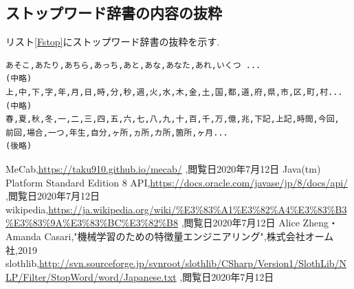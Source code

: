 \documentclass[a4j]{jarticle}
\begin{document}
\subsection{ストップワード辞書の内容の抜粋}
リスト\ref{Fstop}にストップワード辞書の抜粋を示す.
\begin{lstlisting}[basicstyle=\ttfamily\footnotesize, frame=single,label=Fstop,caption=ストップワード辞書の抜粋]
あそこ,あたり,あちら,あっち,あと,あな,あなた,あれ,いくつ ...
(中略)
上,中,下,字,年,月,日,時,分,秒,週,火,水,木,金,土,国,都,道,府,県,市,区,町,村...
(中略)
春,夏,秋,冬,一,二,三,四,五,六,七,八,九,十,百,千,万,億,兆,下記,上記,時間,今回,
前回,場合,一つ,年生,自分,ヶ所,ヵ所,カ所,箇所,ヶ月...
(後略)
	\end{lstlisting}


\begin{thebibliography}{9}
	 MeCab,\url{https://taku910.github.io/mecab/} ,閲覧日2020年7月12日
	 Java(tm) Platform Standard Edition 8 API,\url{https://docs.oracle.com/javase/jp/8/docs/api/} ,閲覧日2020年7月12日
	 wikipedia,\url{https://ja.wikipedia.org/wiki/%E3%83%A1%E3%82%A4%E3%83%B3%E3%83%9A%E3%83%BC%E3%82%B8} ,閲覧日2020年7月12日
	 Alice Zheng・Amanda Casari,"機械学習のための特徴量エンジニアリング",株式会社オーム社,2019
	 slothlib,\url{http://svn.sourceforge.jp/svnroot/slothlib/CSharp/Version1/SlothLib/NLP/Filter/StopWord/word/Japanese.txt} ,閲覧日2020年7月12日

\end{thebibliography}
\end{document}
